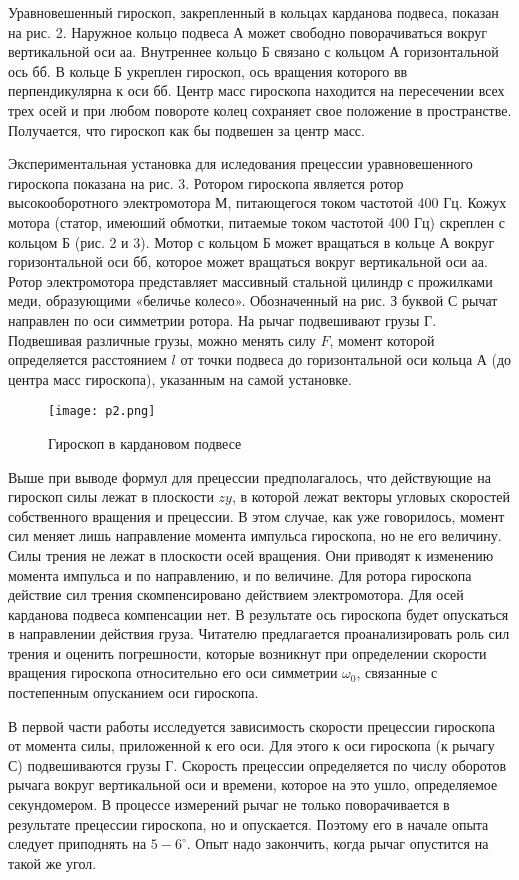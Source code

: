 Уравновешенный гироскоп, закрепленный в кольцах карданова подвеса,
показан на рис. 2. Наружное кольцо подвеса А может свободно
поворачиваться вокруг вертикальной оси аа. Внутреннее кольцо Б
связано с кольцом А горизонтальной ось бб. В кольце Б укреплен
гироскоп, ось вращения которого вв перпендикулярна к оси бб. Центр
масс гироскопа находится на пересечении всех трех осей и при любом
повороте колец сохраняет свое положение в пространстве. Получается,
что гироскоп как бы подвешен за центр масс.

Экспериментальная установка для иследования прецессии
уравновешенного гироскопа показана на рис. 3. Ротором гироскопа
является ротор высокооборотного электромотора М, питающегося током
частотой 400 Гц. Кожух мотора (статор, имеюший обмотки, питаемые
током частотой 400 Гц) скреплен с кольцом Б (рис. 2 и 3). Мотор с
кольцом Б может вращаться в кольце А вокруг горизонтальной оси бб,
которое может вращаться вокруг вертикальной оси аа. Ротор
электромотора представляет массивный стальной цилиндр с прожилками
меди, образующими «беличье колесо». Обозначенный на рис. З буквой
С рычат направлен по оси симметрии ротора. На рычаг подвешивают
грузы Г. Подвешивая различные грузы, можно менять силу $F$, момент
которой определяется расстоянием $l$ от точки подвеса до
горизонтальной оси кольца А (до центра масс гироскопа), указанным
на самой установке.
\begin{figure}[H]
    \centering
\texttt{[image: p2.png]}
    \caption{Гироскоп в кардановом подвесе}
    \label{fig:my_label}
\end{figure}

Выше при выводе формул для прецессии предполагалось, что
действующие на гироскоп силы лежат в плоскости $zy$, в которой
лежат векторы угловых скоростей собственного вращения и прецессии.
В этом случае, как уже говорилось, момент сил меняет лишь
направление момента импульса гироскопа, но не его величину. Силы
трения не лежат в плоскости осей вращения. Они приводят к изменению
момента импульса и по направлению, и по величине. Для ротора
гироскопа действие сил трения скомпенсировано действием
электромотора. Для осей карданова подвеса компенсации нет. В
результате ось гироскопа будет опускаться в направлении действия
груза. Читателю предлагается проанализировать роль сил трения и
оценить погрешности, которые возникнут при определении скорости
вращения гироскопа относительно его оси симметрии $\omega_0$,
связанные с постепенным опусканием оси гироскопа.

В первой части работы исследуется зависимость скорости прецессии
гироскопа от момента силы, приложенной к его оси. Для этого к оси
гироскопа (к рычагу С) подвешиваются грузы Г. Скорость прецессии
определяется по числу оборотов рычага вокруг вертикальной оси и
времени, которое на это ушло, определяемое секундомером. В процессе
измерений рычаг не только поворачивается в результате прецессии
гироскопа, но и опускается. Поэтому его в начале опыта следует
приподнять на $5-6^\circ$. Опыт надо закончить, когда рычаг
опустится на такой же угол.

